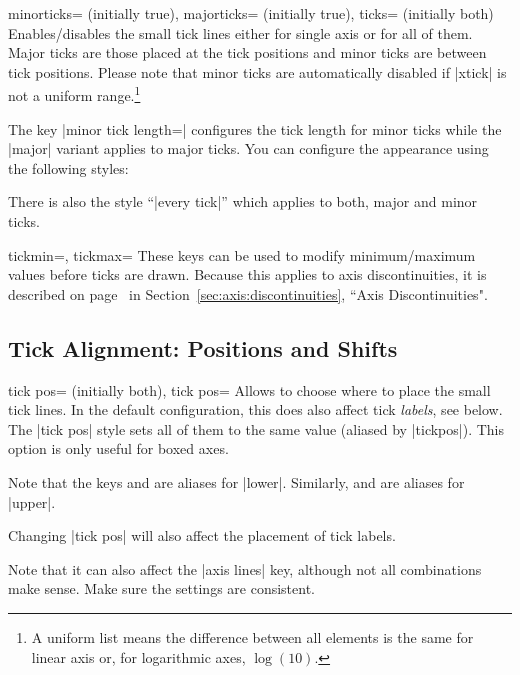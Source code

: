 \begin{pgfplotsxykeylist}{%
    \x minorticks= (initially true),
    \x majorticks= (initially true),
    ticks= (initially both)%
}
    Enables/disables the small tick lines either for single axis or for all of
    them. Major ticks are those placed at the tick positions and minor ticks
    are between tick positions. Please note that minor ticks are automatically
    disabled if |xtick| is not a uniform range.\footnote{A uniform list means
    the difference between all elements is the same for linear axis or, for
    logarithmic axes, $\log(10)$.}

    The key |minor tick length=| configures the tick length for
    minor ticks while the |major| variant applies to major ticks. You can
    configure the appearance using the following styles:
\begin{codeexample}
\end{codeexample}
    There is also the style ``|every tick|'' which applies to both, major and
    minor ticks.
\end{pgfplotsxykeylist}

\begin{pgfplotsxykeylist}{\x tickmin=, \x tickmax=}
    These keys can be used to modify minimum/maximum values before ticks are
    drawn. Because this applies to axis discontinuities, it is described on
    page~\pageref{key:xytickminmax} in Section~\ref{sec:axis:discontinuities},
    ``Axis Discontinuities".
\end{pgfplotsxykeylist}


\subsection{Tick Alignment: Positions and Shifts}

\begin{pgfplotsxykeylist}{%
    \x tick pos= (initially both),
    tick pos=%
}
    Allows to choose where to place the small tick lines. In the default
    configuration, this does also affect tick \emph{labels}, see below. The
    |tick pos| style sets all of them to the same value (aliased by
    |tickpos|). This option is only useful
    for boxed axes.

    Note that the keys  and  are aliases
    for |lower|. Similarly,  and  are
    aliases for |upper|.

    Changing |tick pos| will also affect the placement of tick labels.

    Note that it can also affect the |axis lines| key, although not all
    combinations make sense. Make sure the settings are consistent.
\end{pgfplotsxykeylist}

